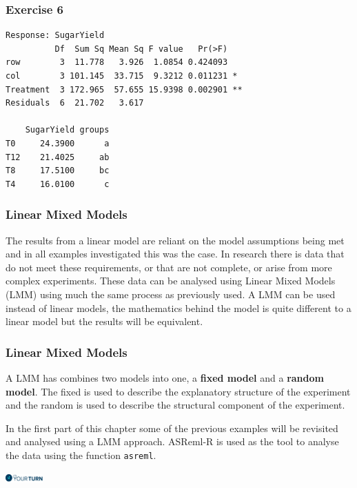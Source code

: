 \begin{frame}[fragile]\frametitle{Exercise 6}
\begin{verbatim}
Response: SugarYield
          Df  Sum Sq Mean Sq F value   Pr(>F)
row        3  11.778   3.926  1.0854 0.424093
col        3 101.145  33.715  9.3212 0.011231 *
Treatment  3 172.965  57.655 15.9398 0.002901 **
Residuals  6  21.702   3.617

    SugarYield groups
T0     24.3900      a
T12    21.4025     ab
T8     17.5100     bc
T4     16.0100      c
\end{verbatim}
\end{frame}


\begin{frame}\frametitle{Linear Mixed Models}
The results from a linear model are reliant on the model assumptions being met and in all examples
investigated this was the case. In research there is data that do not meet these requirements, or
that are not complete, or arise from more complex experiments. These data can be analysed using Linear
Mixed Models (LMM) using much the same process as previously used. A LMM can be used instead of linear models, the
mathematics behind the model is quite different to a linear model but the results will be equivalent.
\end{frame}


\begin{frame}\frametitle{Linear Mixed Models}
A LMM has combines two models into one, a \textbf{fixed model} and a \textbf{random model}.
The fixed is used to describe the explanatory structure of the experiment and the random is
used to describe the structural component of the experiment.

\vspace{0.5cm}

In the first part of this chapter some of the previous examples will be revisited and analysed using a LMM approach.
ASReml-R \cite{asremlr} is used as the tool to analyse the data using the function \texttt{asreml}.

\vspace{1cm}
\flushright
\includegraphics[height = 0.3cm]{yourturn}

\end{frame}


